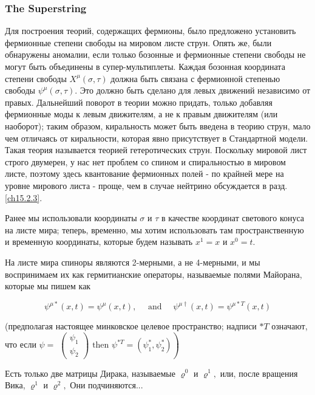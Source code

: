 \documentclass[main.tex]{subfiles}
\begin{document}
\subsubsection{The Superstring}\label{ch17.3.4}

Для построения теорий, содержащих фермионы, было предложено установить фермионные степени свободы на мировом листе струн. Опять же, были обнаружены аномалии, если только бозонные и фермионные степени свободы не могут быть объединены в супер-мультиплеты. Каждая бозонная координата степени свободы $X ^\mu (\sigma, \tau)$ должна быть связана с фермионной степенью свободы $\psi^\mu (\sigma, \tau)$. Это должно быть сделано для левых движений независимо от правых. Дальнейший поворот в теории можно придать, только добавляя фермионные моды к левым движителям, а не к правым движителям (или наоборот); таким образом, киральность может быть введена в теорию струн, мало чем отличаясь от киральности, которая явно присутствует в Стандартной модели. Такая теория называется теорией гетеротических струн.
Поскольку мировой лист строго двумерен, у нас нет проблем со спином и спиральностью в мировом листе, поэтому здесь квантование фермионных полей - по крайней мере на уровне мирового листа - проще, чем в случае нейтрино обсуждается в разд. \ref{ch15.2.3}.

Ранее мы использовали координаты $\sigma$ и $\tau$ в качестве координат светового конуса на листе мира; теперь, временно, мы хотим использовать там пространственную и временную координаты, которые будем называть $x^{1}=x$ и $x^{0}=t$.

На листе мира спиноры являются 2-мерными, а не 4-мерными, и мы воспринимаем их как гермитианские операторы, называемые полями Майорана, которые мы пишем как

\begin{equation}\label{17.120}
\psi^{\mu *}(x, t)=\psi^{\mu}(x, t), \quad \text { and } \quad \psi^{\mu \dagger}(x, t)=\psi^{\mu * T}(x, t)
\end{equation}

(предполагая настоящее минковское целевое пространство; надписи $* T$ означают, что если $\psi=$ $\left.\left(\begin{array}{c}{\psi_{1}} \\ {\psi_{2}}\end{array}\right) \text { then } \psi^{* T}=\left(\psi_{1}^{*}, \psi_{2}^{*}\right)\right)$

Есть только две матрицы Дирака, называемые $\varrho^{0}$ и $\varrho^{1},$ или, после вращения Вика, $\varrho^{1}$ и $\varrho^{2},$ Они подчиняются...
\end{document}
